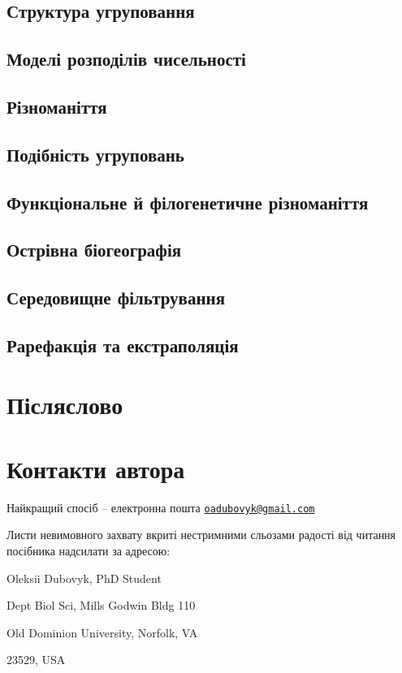 \documentclass[
  11pt,
]{book}
\begin{document}
\section{Структура угруповання}\label{sad}

\section{Моделі розподілів чисельності}\label{sad-model}

\section{Різноманіття}\label{diversity}

\section{Подібність угруповань}\label{similarity}

\section{Функціональне й філогенетичне різноманіття}\label{fd}

\section{Острівна біогеографія}\label{islands}

\section{Середовищне фільтрування}\label{env-filter}

\section{Рарефакція та екстраполяція}\label{rarefaction}

\chapter*{Післяслово}\label{ux43fux456ux441ux43bux44fux441ux43bux43eux432ux43e}

\chapter*{Контакти автора}\label{ux43aux43eux43dux442ux430ux43aux442ux438-ux430ux432ux442ux43eux440ux430}

Найкращий спосіб -- електронна пошта \href{mailto:oadubovyk@gmail.com}{\nolinkurl{oadubovyk@gmail.com}}

Листи невимовного захвату вкриті нестримними сльозами радості від читання посібника надсилати за адресою:

Oleksii Dubovyk, PhD Student

Dept Biol Sci, Mills Godwin Bldg 110

Old Dominion University, Norfolk, VA

23529, USA

  
\end{document}
